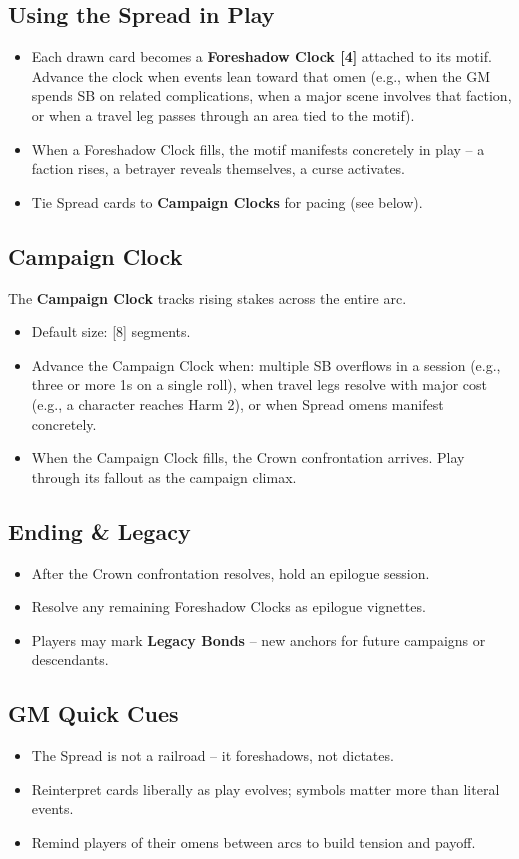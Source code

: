 \subsection{Using the Spread in Play}
\begin{itemize}
  \item Each drawn card becomes a \textbf{Foreshadow Clock [4]} attached to its motif. Advance the clock when events lean toward that omen (e.g., when the GM spends SB on related complications, when a major scene involves that faction, or when a travel leg passes through an area tied to the motif).
  \item When a Foreshadow Clock fills, the motif manifests concretely in play -- a faction rises, a betrayer reveals themselves, a curse activates.
  \item Tie Spread cards to \textbf{Campaign Clocks} for pacing (see below).
\end{itemize}

\subsection{Campaign Clock}
The \textbf{Campaign Clock} tracks rising stakes across the entire arc.
\begin{itemize}
  \item Default size: [8] segments.
  \item Advance the Campaign Clock when: multiple SB overflows in a session (e.g., three or more 1s on a single roll), when travel legs resolve with major cost (e.g., a character reaches Harm 2), or when Spread omens manifest concretely.
  \item When the Campaign Clock fills, the Crown confrontation arrives. Play through its fallout as the campaign climax.
\end{itemize}

\subsection{Ending \& Legacy}
\begin{itemize}
  \item After the Crown confrontation resolves, hold an epilogue session.
  \item Resolve any remaining Foreshadow Clocks as epilogue vignettes.
  \item Players may mark \textbf{Legacy Bonds} -- new anchors for future campaigns or descendants.
\end{itemize}

\subsection{GM Quick Cues}
\begin{itemize}
  \item The Spread is not a railroad -- it foreshadows, not dictates.
  \item Reinterpret cards liberally as play evolves; symbols matter more than literal events.
  \item Remind players of their omens between arcs to build tension and payoff.
\end{itemize}
